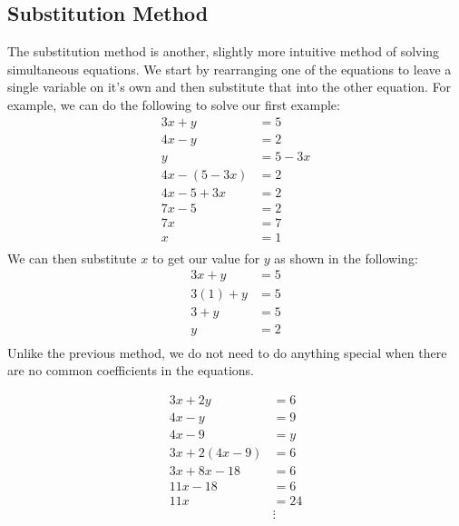 \documentclass{article}
\begin{document}
\subsection{Substitution Method}
The substitution method is another, slightly more intuitive method of solving simultaneous equations. We start by rearranging
one of the equations to leave a single variable on it's own and then substitute that into the other equation. For example, we
can do the following to solve our first example:
\begin{align*}
	3x + y &= 5 \\
	4x - y &= 2 \\
	y &= 5 - 3x \\
	4x - (5 - 3x) &= 2 \\
	4x - 5 + 3x &= 2 \\
	7x - 5 &= 2 \\
	7x &= 7 \\
	x &= 1 \\
\end{align*}
We can then substitute $x$ to get our value for $y$ as shown in the following:
\begin{align*}
	3x + y &= 5 \\
	3(1) + y &= 5 \\
	3 + y &= 5\\
	y &= 2\\
\end{align*}
Unlike the previous method, we do not need to do anything special when there are no common coefficients in the equations.

\begin{align*}
	3x + 2y &= 6 \\
	4x - y &= 9 \\
	4x - 9 &= y \\
	3x + 2(4x - 9) &= 6 \\
	3x + 8x - 18 &= 6 \\
	11x - 18 &= 6 \\
	11x &= 24\\
	&\vdots
\end{align*}

\break
\end{document}

